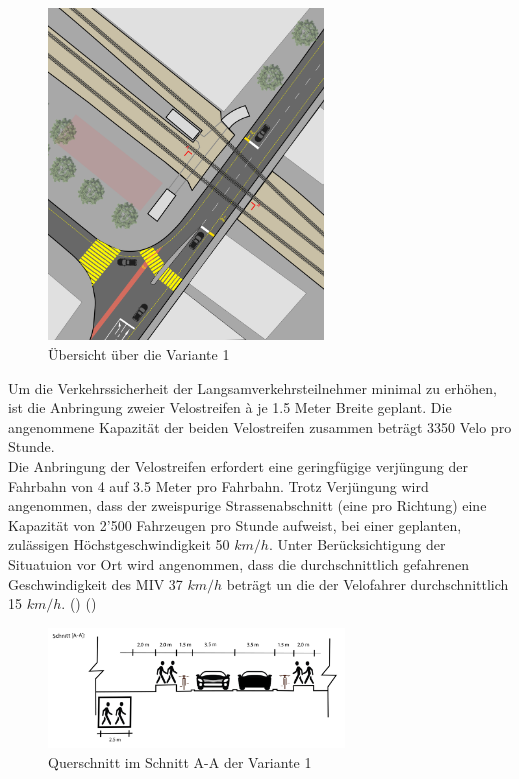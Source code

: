 \begin{figure}[h!]
	\centering
	\includegraphics[width=0.65\textwidth]{figures/f-04-05-01-a-V1}
	\caption[Übersicht Variante 1]{Übersicht über die Variante 1}
	\label{img:V1Ü}
\end{figure}

\pagebreak

Um die Verkehrssicherheit der Langsamverkehrsteilnehmer minimal zu erhöhen, ist die Anbringung zweier Velostreifen à je 1.5 Meter Breite geplant. Die angenommene Kapazität der beiden Velostreifen zusammen beträgt 3350 Velo pro Stunde. \\
Die Anbringung der Velostreifen erfordert eine geringfügige verjüngung der Fahrbahn von 4 auf 3.5 Meter pro Fahrbahn. Trotz Verjüngung wird angenommen, dass der zweispurige Strassenabschnitt (eine pro Richtung) eine Kapazität von 2'500 Fahrzeugen pro Stunde aufweist, bei einer geplanten, zulässigen Höchstgeschwindigkeit 50 $km/h$. Unter Berücksichtigung der Situatuion vor Ort wird angenommen, dass die durchschnittlich gefahrenen Geschwindigkeit des MIV 37 $km/h$ beträgt un die der Velofahrer durchschnittlich 15 $km/h$. (\cite{Nacto2018}) (\cite{Mikrozensus2015})

\begin{figure}[h!]
	\centering
	\includegraphics[width=0.7\textwidth]{figures/f-04-05-01-b-V1}
	\caption[Querschnitt Variante 1]{Querschnitt im Schnitt A-A der Variante 1}
	\label{img:V1Q}
\end{figure}

